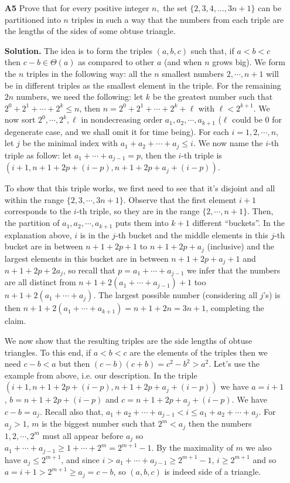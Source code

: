 \documentclass[11pt,a4paper]{article}
\begin{document}
\begin{enumerate}
	\item[\textbf{A5}] Prove that for every positive integer $n,$ the set $\{2,3,4,\ldots,3n+1\}$ can be partitioned into $n$ triples in such a way that the numbers from each triple are the lengths of the sides of some obtuse triangle.
	
	\textbf{Solution.} 
	The idea is to form the triples $(a, b, c)$ such that, if $a<b<c$ then $c-b\in\Theta(a)$ as compared to other $a$ (and when $n$ grows big). We form the $n$ triples in the following way: all the $n$ smallest numbers $2, \cdots , n+1$ will be in different triples as the smallest element in the triple. For the remaining $2n$ numbers, we need the following: let $k$ be the greatest number such that $2^0+2^1+\cdots + 2^k\le n$, then $n=2^0+2^1+\cdots + 2^k+\ell$ with $\ell < 2^{k+1}$. 
	We now sort $2^0, \cdots , 2^k, \ell$ in nondecreasing order $a_1, a_2, \cdots , a_{k+1}$ ($\ell$ could be 0 for degenerate case, and we shall omit it for time being). 
	For each $i=1, 2, \cdots , n$, let $j$ be the minimal index with $a_1+a_2+\cdots + a_j\le i$. 
	We now name the $i$-th triple as follow: let $a_1+\cdots + a_{j-1}=p$, then the $i$-th triple is $(i+1, n+1+2p+(i-p), n+1+2p+a_j+(i-p))$. 
	
	To show that this triple works, we first need to see that it's disjoint and all within the range $\{2, 3, \cdots , 3n+1\}$. Observe that the first element $i+1$ corresponds to the $i$-th triple, so they are in the range $\{2, \cdots , n+1\}$. Then, the partition of $a_1, a_2, \cdots , a_{k+1}$ puts them into $k+1$ different ``buckets''. In the explanation above, $i$ is in the $j$-th bucket and the middle elements in this $j$-th bucket are in between $n+1+2p+1$ to $n+1+2p+a_j$ (inclusive) and the largest elements in this bucket are in between $n+1+2p+a_j+1$ and $n+1+2p+2a_j$, so recall that $p=a_1+\cdots + a_{j-1}$ we infer that the numbers are all distinct from $n+1+2(a_1+\cdots + a_{j-1})+1$ too $n+1+2(a_1+\cdots + a_j)$. The largest possible number (considering all $j$'s) is then $n+1+2(a_1+\cdots + a_{k+1})=n+1+2n=3n+1$, completing the claim. 
	
	We now show that the resulting triples are the side lengths of obtuse triangles. To this end, if $a<b<c$ are the elements of the triples then we need $c-b<a$ but then $(c-b)(c+b)=c^2-b^2>a^2$. 
	Let's use the example from above, i.e. our description. In the triple $(i+1, n+1+2p+(i-p), n+1+2p+a_j+(i-p))$ we have $a=i+1$, $b=n+1+2p+(i-p)$ and $c=n+1+2p+a_j+(i-p)$. 
	We have $c-b=a_j$. 
	Recall also that, $a_1+a_2+\cdots + a_{j-1}<i\le a_1+a_2+\cdots + a_j$. 
	For $a_j>1$, $m$ is the biggest number such that $2^m<a_j$ then the numbers $1, 2, \cdots , 2^{m}$ must all appear before $a_j$ so $a_1+\cdots + a_{j-1}\ge 1+\cdots + 2^{m}=2^{m+1}-1$. 
	By the maximality of $m$ we also have $a_j\le 2^{m+1}$, and since $i>a_1+\cdots + a_{j-1}\ge 2^{m+1}-1$, $i\ge 2^{m+1}$ and so $a=i+1>2^{m+1}\ge a_j=c-b$, so $(a, b, c)$ is indeed side of a triangle. 
	

\end{enumerate}
\end{document}

